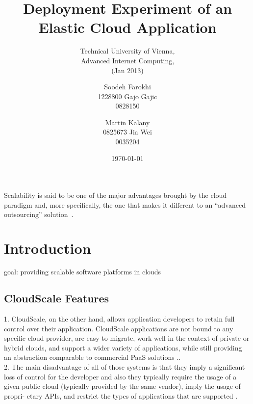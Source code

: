 \documentclass{sig-alternate}
\begin{document}
\title{Deployment Experiment of an Elastic Cloud Application}
\subtitle{Technical University of Vienna,\\Advanced Internet Computing,\\
(Jan 2013)}


\author{
\alignauthor
Soodeh Farokhi\\ %
       1228800
\alignauthor
Gajo Gajic\\
       0828150
\and
\alignauthor
Martin Kalany\\
       0825673
\alignauthor
Jia Wei\\
       0035204
}
       
\date{\today}

\maketitle
\begin{abstract}
\end{abstract}

Scalability is said to be one of the major advantages brought by the cloud paradigm and, more specifically, the one that makes it different to an “advanced outsourcing” solution~\cite{vaquero2011dynamically}.

\section{Introduction}

goal: providing scalable software platforms in clouds


\subsection{CloudScale Features}
1. CloudScale, on the other hand, allows application developers to retain full control over their application. CloudScale applications are not bound to any specific cloud provider, are easy to migrate, work well in the context of private or hybrid clouds, and support a wider variety of applications, while still providing an abstraction comparable to commercial PaaS solutions \cite{Leitner2013}..\\

2. The main disadvantage of all of those systems is that they imply a significant loss of control for the developer and also they typically require the usage of a given public cloud (typically provided by the same vendor), imply the usage of propri- etary APIs, and restrict the types of applications that are supported \cite{Leitner2013}.
\end{document}

